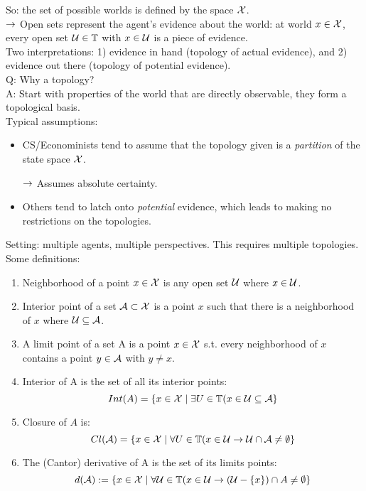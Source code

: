 
So: the set of possible worlds is defined by the space $\mathcal{X}$. \\

$\rightarrow$ Open sets represent the agent's evidence about the world: at world $x \in \mathcal{X}$, every open set $\mathcal{U} \in \mathbb{T}$ with $x \in \mathcal{U}$ is a piece of evidence. \\

Two interpretations: 1) evidence in hand (topology of actual evidence), and 2) evidence out there (topology of potential evidence). \\

Q: Why a topology? \\

A: Start with properties of the world that are directly observable, they form a topological basis. \\

Typical assumptions:
\begin{itemize}
    \item CS/Econominists tend to assume that the topology given is a {\it partition} of the state space $\mathcal{X}$.
    
    $\rightarrow$ Assumes absolute certainty.
    
    \item Others tend to latch onto {\it potential} evidence, which leads to making no restrictions on the topologies.
\end{itemize}

Setting: multiple agents, multiple perspectives. This requires multiple topologies. \\

Some definitions:
\begin{enumerate}
    \item Neighborhood of a point $x \in \mathcal{X}$ is  any open set $\mathcal{U}$ where $x \in \mathcal{U}$.
    \item Interior point of a set $\mathcal{A} \subset \mathcal{X}$ is a point $x$ such that there is a neighborhood of $x$ where $\mathcal{U} \subseteq \mathcal{A}$.
    \item A limit point of a set A is a point $x \in \mathcal{X}$ s.t. every neighborhood of $x$ contains a point $y \in \mathcal{A}$ with $y \neq x$.
    \item Interior of A is the set of all its interior points:
    \[
    Int(A) = \{x \in \mathcal{X} \mid \exists U \in \mathbb{T}(x \in \mathcal{U} \subseteq \mathcal{A}\}
    \]
    \item Closure of $A$ is:
    \[
    Cl(\mathcal{A}) = \{x \in \mathcal{X} \mid \forall U \in \mathbb{T}(x \in \mathcal{U} \rightarrow \mathcal{U} \cap \mathcal{A} \neq \emptyset\}
    \]
    \item The (Cantor) derivative of A is the set of its limits points:
    \[
    d(\mathcal{A}) := \{x \in \mathcal{X} \mid \forall \mathcal{U} \in \mathbb{T}(x \in \mathcal{U} \rightarrow (\mathcal{U} - \{x\})\cap A \neq \emptyset\}
    \]
\end{enumerate}

